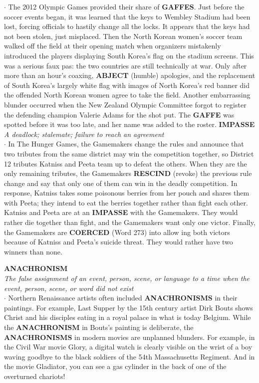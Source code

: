 \documentclass{exam}
\begin{document}
\begin{questions}
$\cdot$ The 2012 Olympic Games provided their share of \textbf{GAFFES}. Just before the soccer events began, it was learned that the keys to Wembley Stadium had been lost, forcing officials to hastily change all the locks. It appears that the keys had not been stolen, just misplaced. Then the North Korean women's soccer team walked off the field at their opening match when organizers mistakenly introduced the players displaying South Korea's flag on the stadium screens. This was a serious faux pas: the two countries are still technically at war. Only after more than an hour's coaxing, \textbf{ABJECT} (humble) apologies, and the replacement of South Korea's largely white flag with images of North Korea's red banner did the offended North Korean women agree to take the field. Another embarrassing blunder occurred when the New Zealand Olympic Committee forgot to register the defending champion Valerie Adams for the shot put. The \textbf{GAFFE} was spotted before it was too late, and her name was added to the roster.
\question \textbf{IMPASSE}\\ 
\textit{A deadlock; stalemate; failure to reach an agreement}\\

$\cdot$ In The Hunger Games, the Gamemakers change the rules and announce that two tributes from the same district may win the competition together, so District 12 tributes Katniss and Peeta team up to defeat the others. When they are the only remaining tributes, the Gamemakers \textbf{RESCIND} (revoke) the previous rule change and say that only one of them can win in the deadly competition. In response, Katniss takes some poisonous berries from her pouch and shares them with Peeta; they intend to eat the berries together rather than fight each other. Katniss and Peeta are at an \textbf{IMPASSE} with the Gamemakers. They would rather die together than fight, and the Gamemakers want only one victor. Finally, the Gamemakers are \textbf{COERCED} (Word 273) into allow ing both victors because of Katniss and Peeta's suicide threat. They would rather have two winners than none.

\question \textbf{ANACHRONISM}\\ 
\textit{The false assignment of an event, person, scene, or language to a time when the event, person, scene, or word did not exist}\\

$\cdot$ Northern Renaissance artists often included \textbf{ANACHRONISMS} in their paintings. For example, Last Supper by the 15th century artist Dirk Bouts shows Christ and his disciples eating in a royal palace in what is today Belgium. While the \textbf{ANACHRONISM} in Bouts's painting is deliberate, the \textbf{ANACHRONISMS} in modern movies are unplanned blunders. For example, in the Civil War movie Glory, a digital watch is clearly visible on the wrist of a boy waving goodbye to the black soldiers of the 54th Massachusetts Regiment. And in the movie Gladiator, you can see a gas cylinder in the back of one of the overturned  chariots!


\end{questions}
\end{document}
